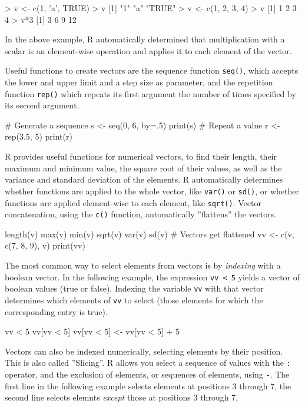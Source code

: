 \begin{Rcode}
> v <- c(1, 'a', TRUE)
> v
[1] "1"    "a"    "TRUE"
> v <- c(1, 2, 3, 4)
> v
[1] 1 2 3 4
> v*3
[1]  3  6  9 12
\end{Rcode}

In the above example, R automatically determined that multiplication with a scalar is an element-wise operation and applies it to each element of the vector. 

Useful functions to create vectors are the sequence function \texttt{seq()}, which accepts the lower and upper limit and a step size as parameter, and the repetition function \texttt{rep()} which repeats its first argument the number of times specified by its second argument.

\begin{Rcode}
# Generate a sequence
s <- seq(0, 6, by=.5)
print(s)
# Repeat a value
r <- rep(3.5, 5)
print(r)
\end{Rcode}

R provides useful functions for numerical vectors, to find their length, their maximum and minimum value, the square root of their values, as well as the variance and standard deviation of the elements. R automatically determines whether functions are applied to the whole vector, like \texttt{var()} or \texttt{sd()}, or whether functions are applied element-wise to each element, like \texttt{sqrt()}. Vector concatenation, using the \texttt{c()} function, automatically ''flattens'' the vectors.

\begin{Rcode}
length(v)
max(v)
min(v)
sqrt(v)
var(v)
sd(v)
# Vectors get flattened
vv <- c(v, c(7, 8, 9), v)
print(vv)
\end{Rcode}

The most common way to select elements from vectors is by \emph{indexing} with a boolean vector. In the following example, the expression \texttt{vv < 5} yields a vector of boolean values (true or false). Indexing the variable \texttt{vv} with that vector determines which elements of \texttt{vv} to select (those elements for which the corresponding entry is true).

\begin{Rcode}
vv < 5
vv[vv < 5]
vv[vv < 5] <- vv[vv < 5] + 5
\end{Rcode}

Vectors can also be indexed numerically, selecting elements by their position. This is also called ''Slicing''. R allows you select a sequence of values with the \texttt{:} operator, and the exclusion of elements, or sequences of elements, using \texttt{-}. The first line in the following example selects elements at positions 3 through 7, the second line selects elemnts \emph{except} those at positions 3 through 7.

